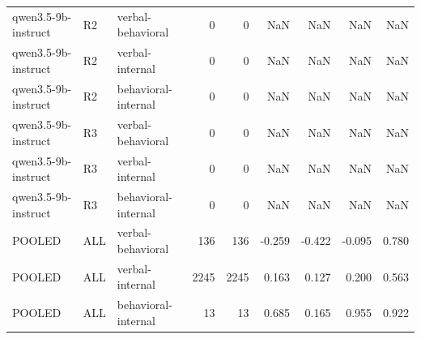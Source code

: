 \begin{table}
\begin{tabular}{lllrrrrrr}
qwen3.5-9b-instruct & R2 & verbal-behavioral & 0 & 0 & NaN & NaN & NaN & NaN \\
qwen3.5-9b-instruct & R2 & verbal-internal & 0 & 0 & NaN & NaN & NaN & NaN \\
qwen3.5-9b-instruct & R2 & behavioral-internal & 0 & 0 & NaN & NaN & NaN & NaN \\
qwen3.5-9b-instruct & R3 & verbal-behavioral & 0 & 0 & NaN & NaN & NaN & NaN \\
qwen3.5-9b-instruct & R3 & verbal-internal & 0 & 0 & NaN & NaN & NaN & NaN \\
qwen3.5-9b-instruct & R3 & behavioral-internal & 0 & 0 & NaN & NaN & NaN & NaN \\
POOLED & ALL & verbal-behavioral & 136 & 136 & -0.259 & -0.422 & -0.095 & 0.780 \\
POOLED & ALL & verbal-internal & 2245 & 2245 & 0.163 & 0.127 & 0.200 & 0.563 \\
POOLED & ALL & behavioral-internal & 13 & 13 & 0.685 & 0.165 & 0.955 & 0.922 \\
\bottomrule
\end{tabular}
\end{table}
